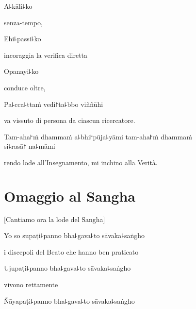 A꜕kāli꜕ko

\begin{english}
senza-tempo, 
\end{english}

Ehi꜕passi꜕ko

\begin{english}
incoraggia la verifica diretta
\end{english}

Opanayi꜕ko

\begin{english}
conduce oltre, 
\end{english}

Pa꜕cca꜕ttaṁ vedi꜓ta꜕bbo viññūhi

\begin{english}
va vissuto di persona da ciascun ricercatore.
\end{english}

Tam-aha꜓ṁ dhammaṁ a꜕bhi꜓pūja꜕yāmi tam-aha꜓ṁ dhammaṁ \\si꜕rasā꜓ na꜕māmi

\begin{english}
rendo lode all'Insegnamento, mi inchino alla Verità. 
\end{english}

\clearpage

\chapter{Omaggio al Sangha}

\begin{leader}
\end{leader}

\begin{english}
[Cantiamo ora la lode del Sangha]
\end{english}

Yo so supaṭi꜕panno bha꜕gava꜕to sāvaka꜕saṅgho

\begin{english}
i discepoli del Beato che hanno ben praticato
\end{english}

Ujupaṭi꜕panno bha꜕gava꜕to sāvaka꜕saṅgho

\begin{english}
vivono rettamente
\end{english}

Ñāyapaṭi꜕panno bha꜕gava꜕to sāvaka꜕saṅgho

